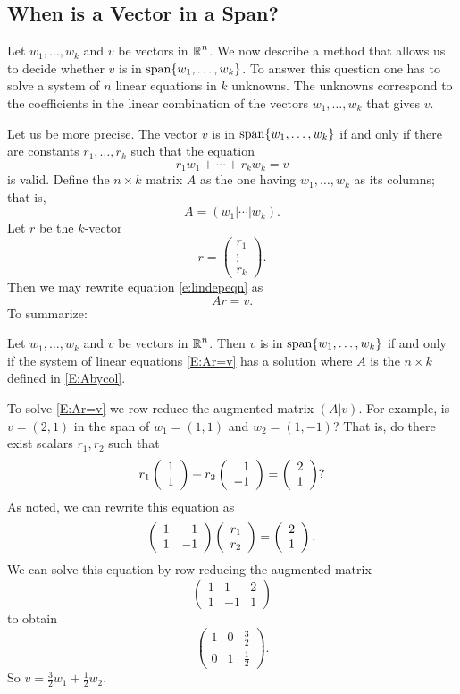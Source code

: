 \documentclass{ximera}
\begin{document}
\subsection*{When is a Vector in a Span?} 

Let $w_1,\ldots,w_k$ and $v$ be vectors in $\mbox{$\Bbb{R}$}^n$.  We now
describe a method that allows us to decide whether $v$ is in
${\rm span}\{w_1,\ldots,w_k\}$.  To answer this question one has
to solve a system of $n$ linear equations in $k$ unknowns.
The unknowns correspond to the coefficients in the linear
combination of the vectors $w_1,\ldots,w_k$ that gives $v$.

Let us be more precise.  The vector $v$ is in
${\rm span}\{w_1,\ldots,w_k\}$ if and only if there are constants
$r_1,\ldots,r_k$ such that the equation
\begin{equation}  \label{e:lindepeqn}
     r_1 w_1 + \cdots + r_k w_k = v
\end{equation}
is valid.  Define the $n\times k$ matrix $A$ as the one having
$w_1,\ldots,w_k$ as its columns; that is,
\begin{equation}  \label{E:Abycol}
A = (w_1| \cdots |w_k).
\end{equation}
Let  $r$ be the $k$-vector
\[
r= \left(\begin{array}{c} r_1 \\ \vdots \\ r_k\end{array}\right).
\]
Then we may rewrite equation \eqref{e:lindepeqn} as
\begin{equation}  \label{E:Ar=v}
   Ar=v.
\end{equation}
To summarize:
\begin{lemma}
Let $w_1,\ldots,w_k$ and $v$ be vectors in $\mbox{$\Bbb{R}$}^n$.  Then $v$
is in ${\rm span}\{w_1,\ldots,w_k\}$ if and only if the system of linear
equations \eqref{E:Ar=v} has a solution where $A$ is the $n\times k$
defined in \eqref{E:Abycol}.
\end{lemma}

To solve \eqref{E:Ar=v} we row reduce the
augmented matrix $(A|v)$.
For example, is $v=(2,1)$ in the span of $w_1=(1,1)$ and $w_2=(1,-1)$?
That is, do there exist scalars $r_1,r_2$ such that
\[
r_1\left(\begin{array}{r} 1 \\ 1\end{array}\right) + r_2\left(\begin{array}{r} 1 \\ -1\end{array}\right) = \left(\begin{array}{r} 2 \\ 1\end{array}\right)?
\]
As noted, we can rewrite this equation as
\[
\left(\begin{array}{rr} 1 & 1\\ 1 &-1\end{array}\right)\left(\begin{array}{r} r_1 \\ r_2\end{array}\right) = \left(\begin{array}{r} 2 \\ 1\end{array}\right).
\]
We can solve this equation by row reducing the augmented
matrix
\[
\left(\begin{array}{rr|r}
1 & 1 & 2 \\ 1 & -1 & 1 \end{array}\right)
\]
to obtain
\[
\left(\begin{array}{rr|r}
1 & 0 & \frac{3}{2} \\ 0 & 1 & \frac{1}{2}
\end{array}\right).
\]
So $v = \frac{3}{2}w_1 + \frac{1}{2}w_2$.
\end{document}
